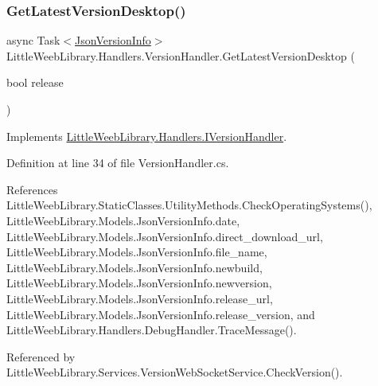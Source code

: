 \subsubsection{\texorpdfstring{Get\+Latest\+Version\+Desktop()}{GetLatestVersionDesktop()}}
{\footnotesize\ttfamily async Task$<$\mbox{\hyperlink{class_little_weeb_library_1_1_models_1_1_json_version_info}{Json\+Version\+Info}}$>$ Little\+Weeb\+Library.\+Handlers.\+Version\+Handler.\+Get\+Latest\+Version\+Desktop (\begin{DoxyParamCaption}\item[{bool}]{release }\end{DoxyParamCaption})}



Implements \mbox{\hyperlink{interface_little_weeb_library_1_1_handlers_1_1_i_version_handler_a0d72fd0650a8bd465bcf22fab766e111}{Little\+Weeb\+Library.\+Handlers.\+I\+Version\+Handler}}.



Definition at line 34 of file Version\+Handler.\+cs.



References Little\+Weeb\+Library.\+Static\+Classes.\+Utility\+Methods.\+Check\+Operating\+Systems(), Little\+Weeb\+Library.\+Models.\+Json\+Version\+Info.\+date, Little\+Weeb\+Library.\+Models.\+Json\+Version\+Info.\+direct\+\_\+download\+\_\+url, Little\+Weeb\+Library.\+Models.\+Json\+Version\+Info.\+file\+\_\+name, Little\+Weeb\+Library.\+Models.\+Json\+Version\+Info.\+newbuild, Little\+Weeb\+Library.\+Models.\+Json\+Version\+Info.\+newversion, Little\+Weeb\+Library.\+Models.\+Json\+Version\+Info.\+release\+\_\+url, Little\+Weeb\+Library.\+Models.\+Json\+Version\+Info.\+release\+\_\+version, and Little\+Weeb\+Library.\+Handlers.\+Debug\+Handler.\+Trace\+Message().



Referenced by Little\+Weeb\+Library.\+Services.\+Version\+Web\+Socket\+Service.\+Check\+Version().


